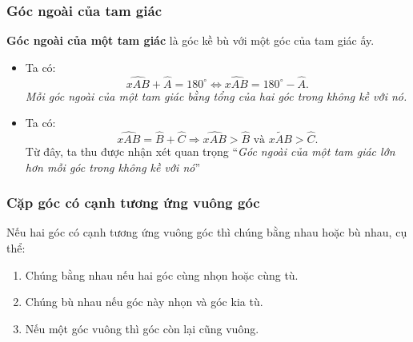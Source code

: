 \subsubsection{Góc ngoài của tam giác}
\textbf{Góc ngoài của một tam giác} là góc kề bù với một góc của tam giác ấy.\\
\begin{nx}
	\begin{itemize}
		\item Ta có: $$\widehat{xAB}+\widehat{A}=180^\circ\Leftrightarrow \widehat{xAB}=180^\circ-\widehat{A}.$$
		\textit{Mỗi góc ngoài của một tam giác bằng tổng của hai góc trong không kề với nó.}
		\item Ta có: $$\widehat{xAB}=\widehat{B}+\widehat{C}\Rightarrow\widehat{xAB}>\widehat{B}\text{ và }\widetilde{xAB}>\widehat{C}.$$
		Từ đây, ta thu được nhận xét quan trọng ``\textit{Góc ngoài của một tam giác lớn hơn mỗi góc trong không kề với nó}''
	\end{itemize}
\end{nx}
\subsubsection{Cặp góc có cạnh tương ứng vuông góc}
Nếu hai góc có cạnh tương ứng vuông góc thì chúng bằng nhau hoặc bù nhau, cụ thể:
\begin{enumerate}	
	\item Chúng bằng nhau nếu hai góc cùng nhọn hoặc cùng tù.
	\item Chúng bù nhau nếu góc này nhọn và góc kia tù.
	\item Nếu một góc vuông thì góc còn lại cũng vuông.
\end{enumerate}
